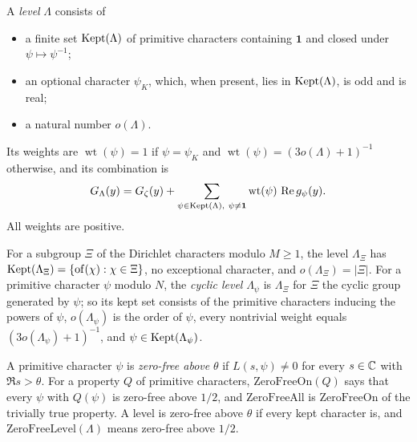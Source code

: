 \begin{definition}[Levels]\label{an:level}
A \emph{level} $\Lambda$ consists of
\begin{itemize}
\item a finite set $\operatorname{Kept}(\Lambda)$ of primitive characters containing
$\mathbf 1$ and closed under $\psi\mapsto\psi^{-1}$;
\item an optional character $\psi_{K}$, which, when present, lies in
$\operatorname{Kept}(\Lambda)$, is odd and is real;
\item a natural number $o(\Lambda)$.
\end{itemize}
Its weights are $\operatorname{wt}(\psi)=1$ if $\psi=\psi_K$ and
$\operatorname{wt}(\psi)=(3o(\Lambda)+1)^{-1}$ otherwise, and its
combination is
\[
G_{\Lambda}(y)=\Gz(y)+\sum_{\psi\in\Kept(\Lambda),\ \psi\ne\mathbf 1}
\operatorname{wt}(\psi)\,\Re g_{\psi}(y).
\]
All weights are positive.
\end{definition}

\begin{definition}\label{an:level-cyc}
For a subgroup $\Xi$ of the Dirichlet characters modulo $M\ge1$, the level
$\Lambda_{\Xi}$ has $\operatorname{Kept}(\Lambda_{\Xi})=\{\operatorname{of}(\chi):\chi\in\Xi\}$,
no exceptional character, and $o(\Lambda_{\Xi})=|\Xi|$. For a primitive
character $\psi$ modulo $N$, the \emph{cyclic level} $\Lambda_{\psi}$ is
$\Lambda_{\Xi}$ for $\Xi$ the cyclic group generated by $\psi$; so its kept
set consists of the primitive characters inducing the powers of $\psi$,
$o(\Lambda_{\psi})$ is the order of $\psi$, every nontrivial weight equals
$(3o(\Lambda_{\psi})+1)^{-1}$, and $\psi\in\operatorname{Kept}(\Lambda_{\psi})$.
\end{definition}

\begin{definition}\label{an:zerofree}
A primitive character $\psi$ is \emph{zero-free above} $\theta$ if
$L(s,\psi)\ne0$ for every $s\in\mathbb{C}$ with $\Re s>\theta$. For a property $Q$
of primitive characters, $\mathrm{ZeroFreeOn}(Q)$ says that every $\psi$
with $Q(\psi)$ is zero-free above $1/2$, and $\mathrm{ZeroFreeAll}$ is
$\mathrm{ZeroFreeOn}$ of the trivially true property. A level is
zero-free above $\theta$ if every kept character is, and
$\mathrm{ZeroFreeLevel}(\Lambda)$ means zero-free above $1/2$.
\end{definition}

